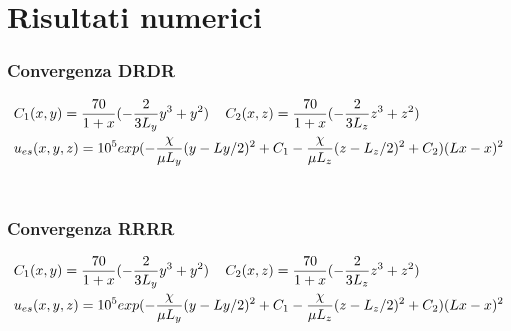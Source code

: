 \section{Risultati numerici}
\begin{frame}
\tableofcontents[currentsection]
\end{frame}

\begin{frame}
\frametitle{Convergenza DRDR}

{\footnotesize
\begin{equation}
\begin{split}
& C_1(x,y)=\frac{70}{1+x}(-\frac{2}{3L_y} y^3+ y^2) \psp{7}
C_2(x,z)=\frac{70}{1+x}(-\frac{2}{3L_z}z^3+z^2) \\
& u_{es}(x,y,z)=10^5exp( - \frac{\chi}{\mu L_y} (y - Ly/2 )^2 + C_1  - \frac{\chi}{\mu L_z}(z - L_z/2 ) ^ 2 + C_2 )(Lx-x)^2 
\end{split}
\end{equation}
}\\

\begin{figure}[!h]
\centering
{}
\label{fig:drdrconv}
\end{figure}
\end{frame}

\begin{frame}
\frametitle{Convergenza RRRR}
{\footnotesize
\begin{equation}
\begin{split}
& C_1(x,y)=\frac{70}{1+x}(-\frac{2}{3L_y} y^3+ y^2) \psp{7}
C_2(x,z)=\frac{70}{1+x}(-\frac{2}{3L_z}z^3+z^2) \\
& u_{es}(x,y,z)=10^5exp( - \frac{\chi}{\mu L_y} (y - Ly/2 )^2 + C_1  - \frac{\chi}{\mu L_z}(z - L_z/2 ) ^ 2 + C_2 )(Lx-x)^2 
\end{split}
\end{equation}
}
\begin{figure}[!h]
\centering
{}
\end{figure}

\end{frame}


